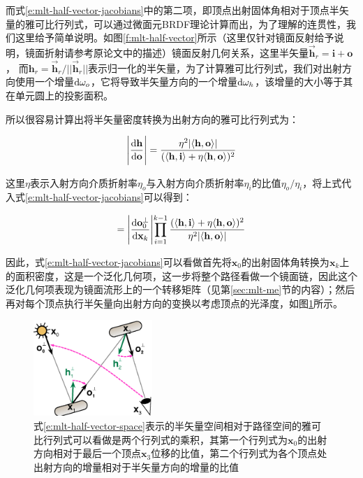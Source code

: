 而式\ref{e:mlt-half-vector-jacobians}中的第二项，即顶点出射固体角相对于顶点半矢量的雅可比行列式，可以通过微面元BRDF理论\cite{a:RobustMonteCarloMethodsforLightTransportSimulation}计算而出，为了理解的连贯性，我们这里给予简单说明。如图\ref{f:mlt-half-vector}所示（这里仅针对镜面反射给予说明，镜面折射请参考原论文中的描述）镜面反射几何关系，这里半矢量$\vec{\mathbf{h}}_r = \mathbf{i} + \mathbf{o}$， 而$\mathbf{h}_r = \vec{\mathbf{h}}_r / ||\vec{\mathbf{h}}_r||$表示归一化的半矢量，为了计算雅可比行列式，我们对出射方向使用一个增量${\rm d}\omega_o$，它将导致半矢量方向的一个增量${\rm d}\omega_h$，该增量的大小等于其在单元圆上的投影面积。

所以很容易计算出将半矢量密度转换为出射方向的雅可比行列式为：

\begin{equation}
	\Bigg|\frac{{\rm d}\mathbf{h}}{{\rm d}\mathbf{o}}\Bigg|=\frac{\eta^{2}|\langle\mathbf{h},\mathbf{o}\rangle|}{(\langle\mathbf{h},\mathbf{i}\rangle+\eta\langle\mathbf{h},\mathbf{o}\rangle)^{2}}
\end{equation}

\noindent 这里$\eta$表示入射方向介质折射率$\eta_o$与入射方向介质折射率$\eta_i$的比值$\eta_o/\eta_i$，将上式代入式\ref{e:mlt-half-vector-jacobians}可以得到：

\begin{equation}\label{e:mlt-half-vector-space-jacobian}
	=\Biggl|\frac{{\rm d}\mathbf{o}^{\perp}_0}{{\rm d}\mathbf{x}_k}\Biggl|\prod^{k-1}_{i=1}\frac{(\langle\mathbf{h},\mathbf{i}\rangle+\eta\langle\mathbf{h},\mathbf{o}\rangle)^{2}}{\eta^{2}|\langle\mathbf{h},\mathbf{o}\rangle|}
\end{equation}

\noindent 因此，式\ref{e:mlt-half-vector-jacobians}可以看做首先将$\mathbf{x}_0$的出射固体角转换为$\mathbf{x}_k$上的面积密度，这是一个泛化几何项，这一步将整个路径看做一个镜面链，因此这个泛化几何项表现为镜面流形上的一个转移矩阵（见第\ref{sec:mlt-me}节的内容）；然后再对每个顶点执行半矢量向出射方向的变换以考虑顶点的光泽度，如图\ref{f:mlt-half-vector-space-jacobians}所示。

\begin{figure}
	\sidecaption
	\includegraphics[width=0.4\textwidth]{figures/mlt/half-vector-space-jacobians}
	\caption{式\ref{e:mlt-half-vector-space}表示的半矢量空间相对于路径空间的雅可比行列式可以看做是两个行列式的乘积，其第一个行列式为$\mathbf{x}_0$的出射方向相对于最后一个顶点$\mathbf{x}_3$位移的比值，第二个行列式为各个顶点处出射方向的增量相对于半矢量方向的增量的比值}
	\label{f:mlt-half-vector-space-jacobians}
\end{figure}




